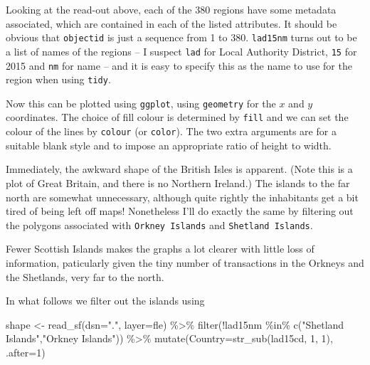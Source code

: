 \documentclass[
  letterpaper,
]{book}
\newenvironment{Shaded}{\begin{snugshade}}{\end{snugshade}}
\newcommand{\AttributeTok}[1]{\textcolor[rgb]{0.40,0.45,0.13}{#1}}
\newcommand{\DecValTok}[1]{\textcolor[rgb]{0.68,0.00,0.00}{#1}}
\newcommand{\FunctionTok}[1]{\textcolor[rgb]{0.28,0.35,0.67}{#1}}
\newcommand{\NormalTok}[1]{\textcolor[rgb]{0.00,0.23,0.31}{#1}}
\newcommand{\OtherTok}[1]{\textcolor[rgb]{0.00,0.23,0.31}{#1}}
\newcommand{\SpecialCharTok}[1]{\textcolor[rgb]{0.37,0.37,0.37}{#1}}
\newcommand{\StringTok}[1]{\textcolor[rgb]{0.13,0.47,0.30}{#1}}
\begin{document}
Looking at the read-out above, each of the 380 regions have some
metadata associated, which are contained in each of the listed
attributes. It should be obvious that \texttt{objectid} is just a
sequence from 1 to 380. \texttt{lad15nm} turns out to be a list of names
of the regions -- I suspect \texttt{lad} for Local Authority District,
\texttt{15} for 2015 and \texttt{nm} for name -- and it is easy to
specify this as the name to use for the region when using \texttt{tidy}.

Now this can be plotted using \texttt{ggplot}, using \texttt{geometry}
for the \(x\) and \(y\) coordinates. The choice of fill colour is
determined by \texttt{fill} and we can set the colour of the lines by
\texttt{colour} (or \texttt{color}). The two extra arguments are for a
suitable blank style and to impose an appropriate ratio of height to
width.

Immediately, the awkward shape of the British Isles is apparent. (Note
this is a plot of Great Britain, and there is no Northern Ireland.) The
islands to the far north are somewhat unnecessary, although quite
rightly the inhabitants get a bit tired of being left off maps!
Nonetheless I'll do exactly the same by filtering out the polygons
associated with \texttt{Orkney\ Islands} and \texttt{Shetland\ Islands}.

Fewer Scottish Islands makes the graphs a lot clearer with little loss
of information, paticularly given the tiny number of transactions in the
Orkneys and the Shetlands, very far to the north.

In what follows we filter out the islands using

\begin{Shaded}
\begin{Highlighting}[]
\NormalTok{shape }\OtherTok{\textless{}{-}} \FunctionTok{read\_sf}\NormalTok{(}\AttributeTok{dsn=}\StringTok{"."}\NormalTok{, }\AttributeTok{layer=}\NormalTok{fle) }\SpecialCharTok{\%\textgreater{}\%}
  \FunctionTok{filter}\NormalTok{(}\SpecialCharTok{!}\NormalTok{lad15nm }\SpecialCharTok{\%in\%} \FunctionTok{c}\NormalTok{(}\StringTok{"Shetland Islands"}\NormalTok{,}\StringTok{"Orkney Islands"}\NormalTok{)) }\SpecialCharTok{\%\textgreater{}\%}
  \FunctionTok{mutate}\NormalTok{(}\AttributeTok{Country=}\FunctionTok{str\_sub}\NormalTok{(lad15cd, }\DecValTok{1}\NormalTok{, }\DecValTok{1}\NormalTok{), }\AttributeTok{.after=}\DecValTok{1}\NormalTok{)}
\end{Highlighting}
\end{Shaded}
\end{document}
